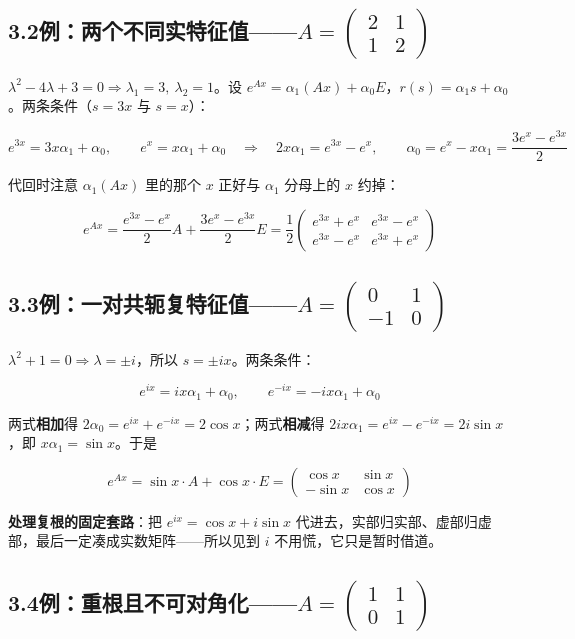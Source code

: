 \documentclass[11pt]{ctexart}
\begin{document}
\subsection*{3.2\quad 例：两个不同实特征值——$A=\begin{pmatrix}2&1\\1&2\end{pmatrix}$}

$\lambda^2-4\lambda+3=0\Rightarrow\lambda_1=3,\ \lambda_2=1$。设 $e^{Ax}=\alpha_1(Ax)+\alpha_0E$，$r(s)=\alpha_1s+\alpha_0$。两条条件（$s=3x$ 与 $s=x$）：

\[
e^{3x}=3x\alpha_1+\alpha_0,\qquad e^{x}=x\alpha_1+\alpha_0
\quad\Longrightarrow\quad
2x\alpha_1=e^{3x}-e^{x},\qquad \alpha_0=e^{x}-x\alpha_1=\frac{3e^{x}-e^{3x}}{2}
\]

代回时注意 $\alpha_1(Ax)$ 里的那个 $x$ 正好与 $\alpha_1$ 分母上的 $x$ 约掉：

\[
e^{Ax}=\frac{e^{3x}-e^{x}}{2}A+\frac{3e^{x}-e^{3x}}{2}E
=\frac{1}{2}\begin{pmatrix}e^{3x}+e^{x} & e^{3x}-e^{x}\\[2pt] e^{3x}-e^{x} & e^{3x}+e^{x}\end{pmatrix}
\]

\subsection*{3.3\quad 例：一对共轭复特征值——$A=\begin{pmatrix}0&1\\-1&0\end{pmatrix}$}

$\lambda^2+1=0\Rightarrow\lambda=\pm i$，所以 $s=\pm ix$。两条条件：

\[
e^{ix}=ix\alpha_1+\alpha_0,\qquad e^{-ix}=-ix\alpha_1+\alpha_0
\]

两式\textbf{相加}得 $2\alpha_0=e^{ix}+e^{-ix}=2\cos x$；两式\textbf{相减}得 $2ix\alpha_1=e^{ix}-e^{-ix}=2i\sin x$，即 $x\alpha_1=\sin x$。于是

\[
e^{Ax}=\sin x\cdot A+\cos x\cdot E=\begin{pmatrix}\cos x & \sin x\\ -\sin x & \cos x\end{pmatrix}
\]

\textbf{处理复根的固定套路}：把 $e^{ix}=\cos x+i\sin x$ 代进去，实部归实部、虚部归虚部，最后一定凑成实数矩阵——所以见到 $i$ 不用慌，它只是暂时借道。

\subsection*{3.4\quad 例：重根且不可对角化——$A=\begin{pmatrix}1&1\\0&1\end{pmatrix}$}
\end{document}
